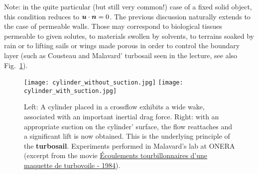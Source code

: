 Note: in the quite particular (but still very common!) case of a fixed solid object, this condition reduces to $\bu\cdot\bn =0$.
 The previous discussion naturally extends to the case of permeable walls. Those may correspond to biological tissues permeable to given solutes, to materials swollen by solvents, to terrains soaked by rain or to lifting sails or wings made porous in order to control the boundary layer (such as Cousteau and Malavard' turbosail seen in the lecture, see also Fig.~\ref{fig:turbosail}).
\begin{figure}[htbp]
\begin{center}
\texttt{[image: cylinder\_without\_suction.jpg]}
\texttt{[image: cylinder\_with\_suction.jpg]}
\caption{Left: A cylinder placed in a crossflow exhibits a wide wake, associated with an important inertial drag force. Right: with an appropriate suction on the cylinder' surface, the flow reattaches and a significant lift is now obtained. This is the underlying principle of the \textbf{turbosail}. Experiments performed in Malavard's lab at ONERA (excerpt from the movie \href{https://dai.ly/x16epb4}{Écoulements tourbillonnaires d'une maquette de turbovoile - 1984}).}
\label{fig:turbosail}
\end{center}
\end{figure}

